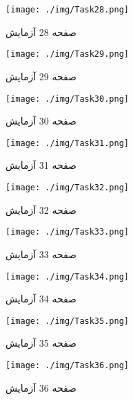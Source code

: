 { 
\begin{figure}[htpb]
\centering
\texttt{[image: ./img/Task28.png]}
\caption{ صفحه 28 آزمایش }
\label{fig:Task28}
\end{figure}
 
 
\begin{figure}[htpb]
\centering
\texttt{[image: ./img/Task29.png]}
\caption{ صفحه 29 آزمایش }
\label{fig:Task29}
\end{figure}
 
 
\begin{figure}[htpb]
\centering
\texttt{[image: ./img/Task30.png]}
\caption{ صفحه 30 آزمایش }
\label{fig:Task30}
\end{figure}
 
 
\begin{figure}[htpb]
\centering
\texttt{[image: ./img/Task31.png]}
\caption{ صفحه 31 آزمایش }
\label{fig:Task31}
\end{figure}
 
 
\begin{figure}[htpb]
\centering
\texttt{[image: ./img/Task32.png]}
\caption{ صفحه 32 آزمایش }
\label{fig:Task32}
\end{figure}
 
 
\begin{figure}[htpb]
\centering
\texttt{[image: ./img/Task33.png]}
\caption{ صفحه 33 آزمایش }
\label{fig:Task33}
\end{figure}
 
 
\begin{figure}[htpb]
\centering
\texttt{[image: ./img/Task34.png]}
\caption{ صفحه 34 آزمایش }
\label{fig:Task34}
\end{figure}
 
 
\begin{figure}[htpb]
\centering
\texttt{[image: ./img/Task35.png]}
\caption{ صفحه 35 آزمایش }
\label{fig:Task35}
\end{figure}
 
 
\begin{figure}[htpb]
\centering
\texttt{[image: ./img/Task36.png]}
\caption{ صفحه 36 آزمایش }
\label{fig:Task36}
\end{figure}
 
}
